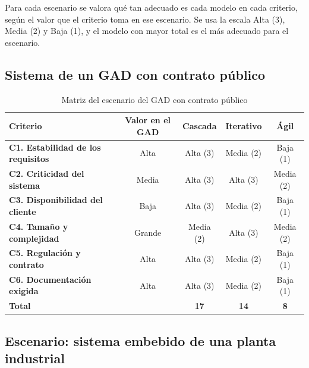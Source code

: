Para cada escenario se valora qué tan adecuado es cada modelo en cada criterio, según el valor que el criterio toma en ese escenario. Se usa la escala Alta (3), Media (2) y Baja (1), y el modelo con mayor total es el más adecuado para el escenario.

\subsection{Sistema de un GAD con contrato público}

\begin{table}[H]
\centering\footnotesize
\caption{Matriz del escenario del GAD con contrato público}\label{tab:matriz-gad}
\begin{tabularx}{\textwidth}{@{}Ycccc@{}}
\toprule
\textbf{Criterio} & \textbf{Valor en el GAD} & \textbf{Cascada} & \textbf{Iterativo} & \textbf{Ágil}\\
\midrule
\textbf{C1. Estabilidad de los requisitos} & Alta & Alta (3) & Media (2) & Baja (1)\\
\textbf{C2. Criticidad del sistema} & Media & Alta (3) & Alta (3) & Media (2)\\
\textbf{C3. Disponibilidad del cliente} & Baja & Alta (3) & Media (2) & Baja (1)\\
\textbf{C4. Tamaño y complejidad} & Grande & Media (2) & Alta (3) & Media (2)\\
\textbf{C5. Regulación y contrato} & Alta & Alta (3) & Media (2) & Baja (1)\\
\textbf{C6. Documentación exigida} & Alta & Alta (3) & Media (2) & Baja (1)\\
\midrule
\textbf{Total} & & \textbf{17} & \textbf{14} & \textbf{8}\\
\bottomrule
\end{tabularx}
\end{table}


\subsection{Escenario: sistema embebido de una planta industrial}

